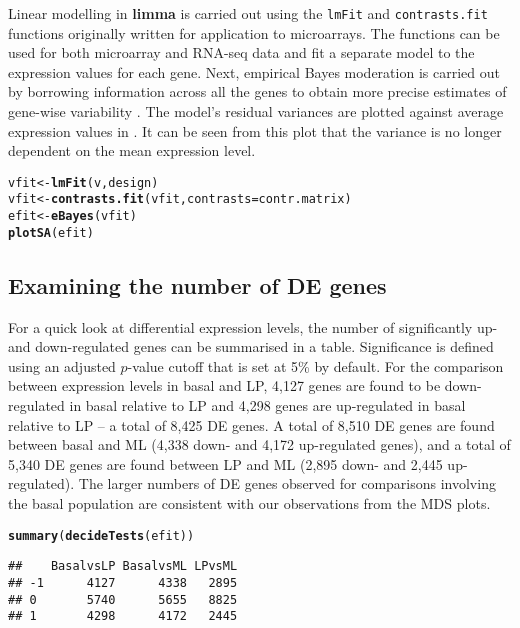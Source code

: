\documentclass[10pt,a4paper]{extarticle}\usepackage[]{graphicx}\usepackage[]{color}
\makeatletter
\newcommand{\hlstd}[1]{\textcolor[rgb]{0.345,0.345,0.345}{#1}}%
\newcommand{\hlkwb}[1]{\textcolor[rgb]{0.69,0.353,0.396}{#1}}%
\newcommand{\hlkwc}[1]{\textcolor[rgb]{0.333,0.667,0.333}{#1}}%
\newcommand{\hlkwd}[1]{\textcolor[rgb]{0.737,0.353,0.396}{\textbf{#1}}}%
\newenvironment{kframe}{%
 \def\at@end@of@kframe{}%
 \ifinner\ifhmode%
  \def\at@end@of@kframe{\end{minipage}}%
  \begin{minipage}{\columnwidth}%
 \fi\fi%
 \def\FrameCommand##1{\hskip\@totalleftmargin \hskip-\fboxsep
 \colorbox{shadecolor}{##1}\hskip-\fboxsep
     \hskip-\linewidth \hskip-\@totalleftmargin \hskip\columnwidth}%
 \MakeFramed {\advance\hsize-\width
   \@totalleftmargin\z@ \linewidth\hsize
   \@setminipage}}%
 {\par\unskip\endMakeFramed%
 \at@end@of@kframe}
\newenvironment{knitrout}{}{} %
\makeatother
\begin{document}
Linear modelling in \textbf{limma} is carried out using the \texttt{lmFit} and \texttt{contrasts.fit} functions originally written for application to microarrays. The functions can be used for both microarray and RNA-seq data and fit a separate model to the expression values for each gene. Next, empirical Bayes moderation is carried out by borrowing information across all the genes to obtain more precise estimates of gene-wise variability \cite{Smyth:SAGMB:2004}. The model's residual variances are plotted against average expression values in {}. It can be seen from this plot that the variance is no longer dependent on the mean expression level.
\begin{knitrout}
\color{fgcolor}\begin{kframe}
\begin{alltt}
\hlstd{vfit} \hlkwb{<-} \hlkwd{lmFit}\hlstd{(v, design)}
\hlstd{vfit} \hlkwb{<-} \hlkwd{contrasts.fit}\hlstd{(vfit,} \hlkwc{contrasts}\hlstd{=contr.matrix)}
\hlstd{efit} \hlkwb{<-} \hlkwd{eBayes}\hlstd{(vfit)}
\hlkwd{plotSA}\hlstd{(efit)}
\end{alltt}
\end{kframe}
\end{knitrout}

\subsection*{Examining the number of DE genes}

For a quick look at differential expression levels, the number of significantly up- and down-regulated genes can be summarised in a table. Significance is defined using an adjusted $p$-value cutoff that is set at 5\% by default. For the comparison between expression levels in basal and LP, 4,127 genes are found to be down-regulated in basal relative to LP and 4,298 genes are up-regulated in basal relative to LP -- a total of 8,425 DE genes. A total of 8,510 DE genes are found between basal and ML (4,338 down- and 4,172 up-regulated genes), and a total of 5,340 DE genes are found between LP and ML (2,895 down- and 2,445 up-regulated). The larger numbers of DE genes observed for comparisons involving the basal population are consistent with our observations from the MDS plots.
\begin{knitrout}
\color{fgcolor}\begin{kframe}
\begin{alltt}
\hlkwd{summary}\hlstd{(}\hlkwd{decideTests}\hlstd{(efit))}
\end{alltt}
\begin{verbatim}
##    BasalvsLP BasalvsML LPvsML
## -1      4127      4338   2895
## 0       5740      5655   8825
## 1       4298      4172   2445
\end{verbatim}
\end{kframe}
\end{knitrout}
\end{document}
